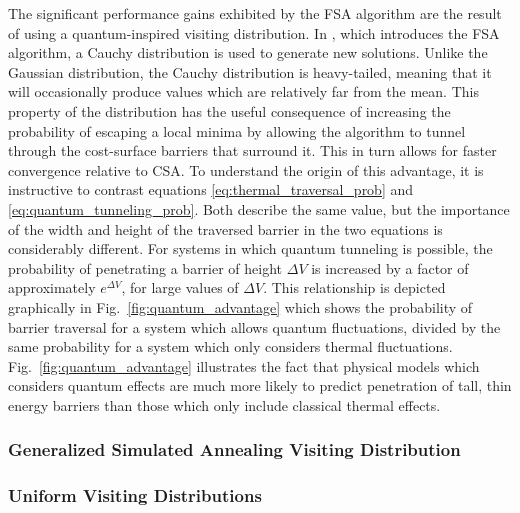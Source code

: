 \documentclass[11pt]{afthesis}
\begin{document}
	 The significant performance gains exhibited by the FSA algorithm are the result of using a quantum-inspired visiting distribution. In \cite{szu1987fastsimulatedannealing}, which introduces the FSA algorithm, a Cauchy distribution is used to generate new solutions. Unlike the Gaussian distribution, the Cauchy distribution is heavy-tailed, meaning that it will occasionally produce values which are relatively far from the mean. This property of the distribution has the useful consequence of increasing the probability of escaping a local minima by allowing the algorithm to tunnel through the cost-surface barriers that surround it. This in turn allows for faster convergence relative to CSA. To understand the origin of this advantage, it is instructive to contrast equations \ref{eq:thermal_traversal_prob} and \ref{eq:quantum_tunneling_prob}. Both describe the same value, but the importance of the width and height of the traversed barrier in the two equations is considerably different. For systems in which quantum tunneling is possible, the probability of penetrating a barrier of height \begin{math} \Delta V \end{math} is increased by a factor of approximately \begin{math} e^{\Delta V} \end{math}, for large values of \begin{math} \Delta V \end{math}. This relationship is depicted graphically in Fig.~\ref{fig:quantum_advantage} which shows the probability of barrier traversal for a system which allows quantum fluctuations, divided by the same probability for a system which only considers thermal fluctuations. Fig.~\ref{fig:quantum_advantage} illustrates the fact that physical models which considers quantum effects are much more likely to predict penetration of tall, thin energy barriers than those which only include classical thermal effects. 

	

	\subsubsection{Generalized Simulated Annealing Visiting Distribution}
	
	\subsubsection{Uniform Visiting Distributions}
	
\end{document}
